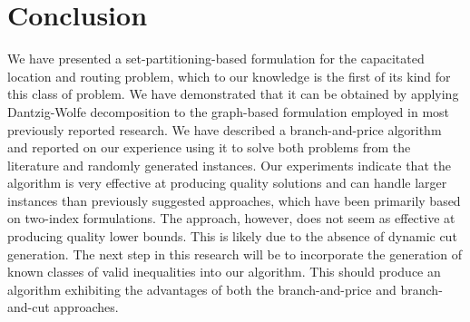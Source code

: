 \documentclass[graybox]{./styles/svmult}
\begin{document}
\section{Conclusion}
\label{sec:Conc}
We have presented a set-partitioning-based formulation for the
capacitated location and routing problem, which to our knowledge is
the first of its kind for this class of problem. We have demonstrated
that it can be obtained by applying Dantzig-Wolfe decomposition to the
graph-based formulation employed in most previously reported research.
We have described a branch-and-price algorithm and reported on our
experience using it to solve both problems from the literature and
randomly generated instances. Our experiments indicate that the
algorithm is very effective at producing quality solutions and can
handle larger instances than previously suggested approaches, which
have been primarily based on two-index formulations. The approach, however, does
not seem as effective at producing quality lower bounds. This is
likely due to the absence of dynamic cut generation.
The next step in this research will be to incorporate the generation
of known classes of valid inequalities into our algorithm. This should
produce an algorithm exhibiting the advantages of both the
branch-and-price and branch-and-cut approaches.




%
\end{document}

